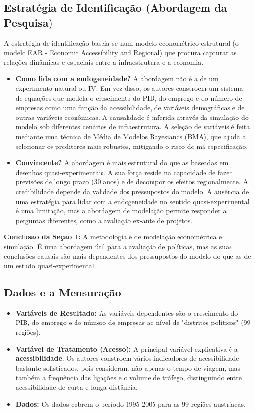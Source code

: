 \documentclass[12pt, a4paper]{article}
\begin{document}
\subsection{Estratégia de Identificação (Abordagem da Pesquisa)}
A estratégia de identificação baseia-se num modelo econométrico estrutural (o modelo EAR - Economic Accessibility and Regional) que procura capturar as relações dinâmicas e espaciais entre a infraestrutura e a economia.

\begin{itemize}
    \item \textbf{Como lida com a endogeneidade?} A abordagem não é a de um experimento natural ou IV. Em vez disso, os autores constroem um sistema de equações que modela o crescimento do PIB, do emprego e do número de empresas como uma função da acessibilidade, de variáveis demográficas e de outras variáveis econômicas. A causalidade é inferida através da simulação do modelo sob diferentes cenários de infraestrutura. A seleção de variáveis é feita mediante uma técnica de Média de Modelos Bayesianos (BMA), que ajuda a selecionar os preditores mais robustos, mitigando o risco de má especificação.
    \item \textbf{Convincente?} A abordagem é mais estrutural do que as baseadas em desenhos quasi-experimentais. A sua força reside na capacidade de fazer previsões de longo prazo (30 anos) e de decompor os efeitos regionalmente. A credibilidade depende da validade dos pressupostos do modelo. A ausência de uma estratégia para lidar com a endogeneidade no sentido quasi-experimental é uma limitação, mas a abordagem de modelação permite responder a perguntas diferentes, como a avaliação ex-ante de projetos.
\end{itemize}

\noindent\textbf{Conclusão da Seção 1:} A metodologia é de modelação econométrica e simulação. É uma abordagem útil para a avaliação de políticas, mas as suas conclusões causais são mais dependentes dos pressupostos do modelo do que as de um estudo quasi-experimental.

\subsection{Dados e a Mensuração}

\begin{itemize}
    \item \textbf{Variáveis de Resultado:} As variáveis dependentes são o crescimento do PIB, do emprego e do número de empresas ao nível de "distritos políticos" (99 regiões).
    \item \textbf{Variável de Tratamento (Acesso):} A principal variável explicativa é a \textbf{acessibilidade}. Os autores constroem vários indicadores de acessibilidade bastante sofisticados, pois consideram não apenas o tempo de viagem, mas também a frequência das ligações e o volume de tráfego, distinguindo entre acessibilidade de curta e longa distância.
    \item \textbf{Dados:} Os dados cobrem o período 1995-2005 para as 99 regiões austríacas.
\end{itemize}
\end{document}
